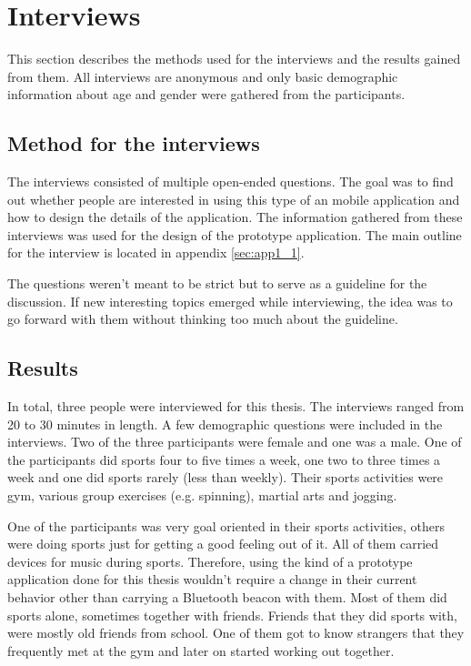 \section{Interviews}

This section describes the methods used for the interviews and the results gained from them. All interviews are anonymous and only basic demographic information about age and gender were gathered from the participants.

\subsection{Method for the interviews}

The interviews consisted of multiple open-ended questions. The goal was to find out whether people are interested in using this type of an mobile application and how to design the details of the application. The information gathered from these interviews was used for the design of the prototype application. The main outline for the interview is located in appendix \ref{sec:app1_1}.

The questions weren't meant to be strict but to serve as a guideline for the discussion. If new interesting topics emerged while interviewing, the idea was to go forward with them without thinking too much about the guideline.

\subsection{Results}

In total, three people were interviewed for this thesis. The interviews ranged from 20 to 30 minutes in length. A few demographic questions were included in the interviews. Two of the three participants were female and one was  a male. One of the participants did sports four to five times a week, one two to three times a week and one did sports rarely (less than weekly). Their sports activities were gym, various group exercises (e.g. spinning), martial arts and jogging.

One of the participants was very goal oriented in their sports activities, others were doing sports just for getting a good feeling out of it. All of them carried devices for music during sports. Therefore, using the kind of a prototype application done for this thesis wouldn't require a change in their current behavior other than carrying a Bluetooth beacon with them. Most of them did sports alone, sometimes together with friends. Friends that they did sports with, were mostly old friends from school. One of them got to know strangers that they frequently met at the gym and later on started working out together.


